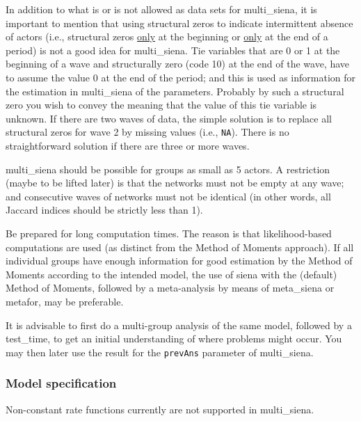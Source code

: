 \documentclass[a4paper,fleqn,11pt]{article}
\newcommand{\+}{\, + \,}
\newcommand{\sfn}[1]{\textsf{#1}}
\begin{document}
In addition to what is or is not allowed as data sets for \textsf{multi\_siena},
it is important to mention that using structural zeros to indicate
intermittent absence of actors (i.e., structural zeros \underline{only} at the beginning
or  \underline{only} at the end of a period) is not a good idea
for \textsf{multi\_siena}.
Tie variables that are 0 or 1 at the beginning of a wave and
structurally zero (code 10) at the end of the wave, have to assume
the value 0 at the end of the period; and this is used as information
for the estimation in \textsf{multi\_siena} of the parameters.
Probably by such a structural zero you wish to convey the meaning that the value
of this tie variable is unknown.
If there are two waves of data, the simple solution is to replace
all structural zeros for wave 2 by missing values (i.e., \texttt{NA}).
There is no straightforward solution if there are three or more waves.
\medskip

\textsf{multi\_siena} should be possible for groups as small as 5 actors.
A restriction (maybe to be lifted later) is that the networks must not be
empty at any wave; and consecutive waves of networks must not be identical
(in other words, all Jaccard indices should be strictly less than 1).

Be prepared for long computation times. The reason is that likelihood-based
computations are used (as distinct from the Method of Moments approach).
If all individual groups have enough information for good estimation by
the Method of Moments according to the intended model,
the use of \sfn{siena} with the (default) Method of Moments, followed by a
meta-analysis by means of \sfn{meta\_siena} or \sfn{metafor}, may be preferable.

It is advisable to first do a multi-group analysis of the same model,
followed by a \textsf{test\_time}, to get an initial understanding of where problems
might occur. You may then later use the result for the \texttt{prevAns}
parameter of \textsf{multi\_siena}.


\subsubsection{Model specification}

Non-constant rate functions currently are not supported in \textsf{multi\_siena}.
\end{document}
